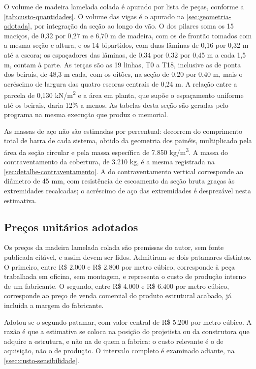 O volume de madeira lamelada colada é apurado por lista de peças, conforme a
\autoref{tab:custo-quantidades}. O volume das vigas é o apurado na
\autoref{sec:geometria-adotada}, por integração da seção ao longo do vão. O dos
pilares soma os 15 maciços, de 0,32 por 0,27 m e 6,70 m de madeira, com os de
frontão tomados com a mesma seção e altura, e os 14 bipartidos, com duas lâminas
de 0,16 por 0,32 m até a escora; os espaçadores das lâminas, de 0,34 por 0,32 por
0,45 m a cada 1,5 m, contam à parte. As terças são as 19 linhas, T0 a T18,
inclusive as de ponta dos beirais, de 48,3 m cada, com os oitões, na seção de 0,20
por 0,40 m, mais o acréscimo de largura das quatro escoras centrais de 0,24 m. A
relação entre a parcela de 0,130 kN/m\textsuperscript{2} e a área em planta, que
supõe o espaçamento uniforme até os beirais, daria 12\% a menos. As tabelas desta
seção são geradas pelo programa na mesma execução que produz o memorial.



As massas de aço não são estimadas por percentual: decorrem do comprimento
total de barra de cada sistema, obtido da geometria dos painéis, multiplicado
pela área da seção circular e pela massa específica de 7.850 kg/m\textsuperscript{3}.
A massa do contraventamento da cobertura, de 3.210 kg, é a mesma registrada na
\autoref{sec:detalhe-contraventamento}. A do contraventamento vertical
corresponde ao diâmetro de 45 mm, com resistência de escoamento da seção bruta
graças às extremidades recalcadas; o acréscimo de aço das extremidades é
desprezável nesta estimativa.

\subsection{Preços unitários adotados}\label{ssec:custo-unitarios}

Os preços da madeira lamelada colada são premissas do autor, sem fonte
publicada citável, e assim devem ser lidos. Admitiram-se dois patamares
distintos. O primeiro, entre R\$ 2.000 e R\$ 2.800 por metro cúbico, corresponde à
peça trabalhada em oficina, sem montagem, e representa o custo de produção
interno de um fabricante. O segundo, entre R\$ 4.000 e R\$ 6.400 por metro
cúbico, corresponde ao preço de venda comercial do produto estrutural acabado,
já incluída a margem do fabricante.

Adotou-se o segundo patamar, com valor central de R\$ 5.200 por metro cúbico.
A razão é que a estimativa se coloca na posição do projetista ou da construtora
que adquire a estrutura, e não na de quem a fabrica: o custo relevante é o de
aquisição, não o de produção. O intervalo completo é examinado adiante, na
\autoref{ssec:custo-sensibilidade}.

